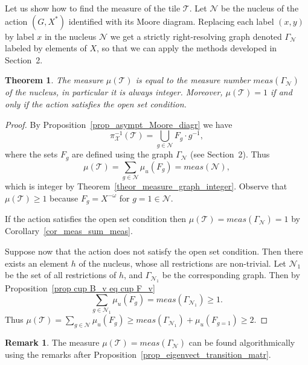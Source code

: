 \documentclass[12pt]{article}
\newcommand{\xmo}{X^{-\omega}}
\newcommand{\limGs}[1][G]{\mathcal{X}_{#1}}
\newcommand{\mgr}{meas}
\newcommand{\tile}{\mathscr{T}}
\newcommand{\nucl}{\mathcal{N}}
\newcommand{\gr}{\Gamma}
\newtheorem{theor}{Theorem}
\theoremstyle{definition}
\newtheorem{defi}{Definition}
\newtheorem{remark}{Remark}
\begin{document}
Let us show how to find the measure of the tile $\tile$. Let $\nucl$ be the nucleus of the action
$(G,X^*)$ identified with its Moore diagram. Replacing each label $(x,y)$ by label $x$ in the
nucleus $\nucl$ we get a strictly right-resolving graph denoted $\gr_{\nucl}$ labeled by elements
of $X$, so that we can apply the methods developed in Section~2.


\begin{theor}\label{theor_tile_measure}
The measure $\mu(\tile)$ is equal to the measure number $\mgr(\gr_\nucl)$ of the nucleus, in
particular it is always integer. Moreover, $\mu(\tile)=1$ if and only if the action satisfies the
open set condition.
\end{theor}
\begin{proof}
By Proposition~\ref{prop_asympt_Moore_diagr} we have
\[
\pi^{-1}_{\limGs[]}(\tile)=\bigcup_{g\in\nucl}F_g\cdot g^{-1},
\]
where the sets $F_g$ are defined using the graph $\gr_\nucl$ (see Section~2). Thus
\[
\mu(\tile)=\sum_{g\in\nucl}\mu_u(F_g)=\mgr(\nucl),
\]
which is integer by Theorem~\ref{theor_measure_graph_integer}. Observe that $\mu(\tile)\geq 1$
because $F_g=\xmo$ for $g=1\in\nucl$.

If the action satisfies the open set condition then $\mu(\tile)=\mgr(\gr_\nucl)=1$ by
Corollary~\ref{cor_meas_sum_meas}.

Suppose now that the action does not satisfy the open set condition. Then there exists an element
$h$ of the nucleus, whose all restrictions are non-trivial. Let $\nucl_1$ be the set of all
restrictions of $h$, and $\gr_{\nucl_1}$ be the corresponding graph. Then by Proposition~\ref{prop
cup B_v eq cup F_v}
\[
\sum_{g\in\nucl_1}\mu_u(F_g)=\mgr(\gr_{\nucl_1})\geq 1.
\]
Thus $\mu(\tile)=\sum_{g\in\nucl}\mu_u(F_g)\geq \mgr(\gr_{\nucl_1})+\mu_u(F_{g=1})\geq 2$.
\end{proof}

\begin{remark}
The measure $\mu(\tile)=\mgr(\gr_{\nucl})$ can be found algorithmically using the remarks after
Proposition~\ref{prop_eigenvect_transition_matr}.
\end{remark}


\end{document}
